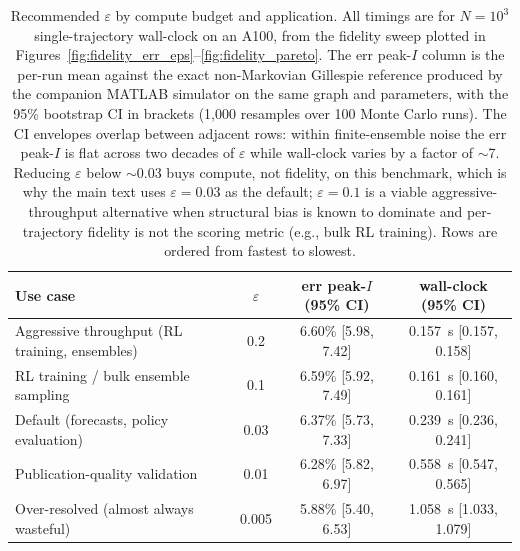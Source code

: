 \begin{table}[H]
\caption{Recommended $\varepsilon$ by compute budget and application. All timings are for $N = 10^3$ single-trajectory wall-clock on an A100, from the fidelity sweep plotted in Figures~\ref{fig:fidelity_err_eps}--\ref{fig:fidelity_pareto}. The err peak-$I$ column is the per-run mean against the exact non-Markovian Gillespie reference produced by the companion MATLAB simulator on the same graph and parameters, with the 95\% bootstrap CI in brackets (1{,}000 resamples over 100 Monte Carlo runs). The CI envelopes overlap between adjacent rows: within finite-ensemble noise the err peak-$I$ is flat across two decades of $\varepsilon$ while wall-clock varies by a factor of $\sim$7. Reducing $\varepsilon$ below $\sim$0.03 buys compute, not fidelity, on this benchmark, which is why the main text uses $\varepsilon = 0.03$ as the default; $\varepsilon = 0.1$ is a viable aggressive-throughput alternative when structural bias is known to dominate and per-trajectory fidelity is not the scoring metric (e.g., bulk RL training). Rows are ordered from fastest to slowest.}
\label{tab:fidelity_budget}
\centering
\begin{tabular*}{\linewidth}{@{}lccc@{}}
\toprule
\textbf{Use case}                              & $\varepsilon$ & \textbf{err peak-$I$ (95\% CI)} & \textbf{wall-clock (95\% CI)} \\
\midrule
Aggressive throughput (RL training, ensembles) & 0.2  & 6.60\% [5.98, 7.42]  & 0.157~s [0.157, 0.158] \\
RL training / bulk ensemble sampling           & 0.1  & 6.59\% [5.92, 7.49]  & 0.161~s [0.160, 0.161] \\
Default (forecasts, policy evaluation)         & 0.03 & 6.37\% [5.73, 7.33]  & 0.239~s [0.236, 0.241] \\
Publication-quality validation                 & 0.01 & 6.28\% [5.82, 6.97]  & 0.558~s [0.547, 0.565] \\
Over-resolved (almost always wasteful)         & 0.005& 5.88\% [5.40, 6.53]  & 1.058~s [1.033, 1.079] \\
\bottomrule
\end{tabular*}
\end{table}

